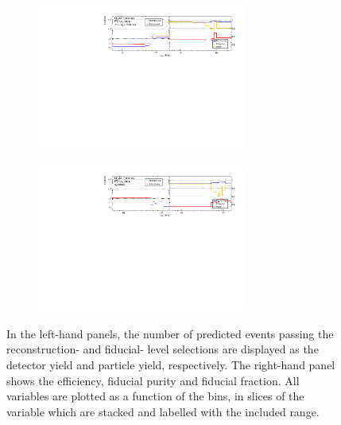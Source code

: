\begin{figure}[htb]
\begin{subfigure}{.99\textwidth}
    \end{subfigure}
    \begin{subfigure}{.99\textwidth}\centering
        \includegraphics[width = 0.75\textwidth]{Figures/m4l/UnfoldingStudies/v014_inputs/m12_m4l180-2000inputs.pdf}
    \end{subfigure}
    \begin{subfigure}{.99\textwidth}\centering
        \includegraphics[width = 0.75\textwidth]{Figures/m4l/UnfoldingStudies/v014_inputs/m12_m4loffshellinputs.pdf}
    \end{subfigure}
    \caption{In the left-hand panels, the number of predicted events passing the reconstruction- and fiducial- level selections are displayed as the detector yield and particle yield, respectively. The right-hand panel shows the efficiency, fiducial purity and fiducial fraction. All variables are plotted as a function of the \mZOne bins, in slices of the \mFourL variable which are stacked and labelled with the included \mFourL range.
    \label{fig:mZ1unf}}
\end{figure}  

\FloatBarrier
\clearpage


